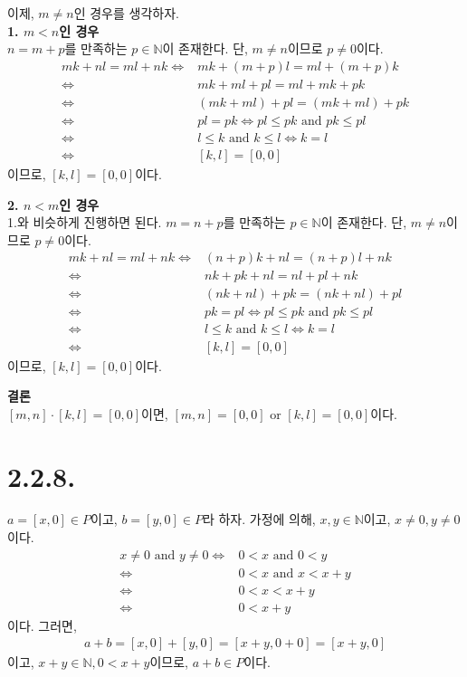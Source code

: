 \documentclass{article}
\begin{document}
이제, $m \neq n$인 경우를 생각하자.
\\ \textbf{1. $m < n$인 경우}
\\ $n = m + p$를 만족하는 $p \in \mathbb{N}$이 존재한다. 단, $m \neq n$이므로 $p \neq 0$이다.
\begin{align*}
mk+nl = ml+nk \iff& mk+(m+p)l = ml + (m+p)k
\\ \iff& mk+ml+pl = ml+mk+pk
\\ \iff& (mk+ml)+pl = (mk+ml)+pk
\\ \iff& pl = pk \iff pl \le pk \text{ and } pk \le pl
\\ \iff& l \le k \text{ and } k \le l \iff k = l
\\ \iff& [k, l] = [0, 0]
\end{align*}이므로, $[k, l] = [0, 0]$이다.

\textbf{2. $n < m$인 경우}
\\ 1.와 비슷하게 진행하면 된다. $m = n + p$를 만족하는 $p \in \mathbb{N}$이 존재한다. 단, $m \neq n$이므로 $p \neq 0$이다.
\begin{align*}
mk+nl = ml+nk \iff& (n+p)k+nl = (n+p)l + nk
\\ \iff& nk+pk+nl = nl+pl+nk
\\ \iff& (nk+nl)+pk = (nk+nl)+pl
\\ \iff& pk = pl \iff pl \le pk \text{ and } pk \le pl
\\ \iff& l \le k \text{ and } k \le l \iff k = l
\\ \iff& [k, l] = [0, 0]
\end{align*}이므로, $[k, l] = [0, 0]$이다.

\textbf{결론} 
\\$[m, n] \cdot [k, l] = [0, 0]$이면, $[m, n] = [0, 0] \text{ or } [k, l] = [0, 0]$이다.

\section{2.2.8.}
$a = [x, 0]\in P$이고, $b = [y, 0] \in P$라 하자.  가정에 의해, $x, y \in \mathbb{N}$이고, $x \neq 0, y \neq 0$이다.
\begin{align*}
x \neq 0 \text{ and } y \neq 0 \iff& 0 < x \text{ and } 0 < y
\\ \iff& 0 < x \text{ and } x < x + y
\\ \iff& 0 < x < x + y
\\ \iff& 0 < x + y
\end{align*}이다. 그러면,
\begin{align*}
a+b = [x, 0] + [y, 0] = [x+y, 0+0] = [x+y, 0]
\end{align*}이고, $x+y \in \mathbb{N}, 0 < x+y$이므로, $a+b \in P$이다.
\end{document}
